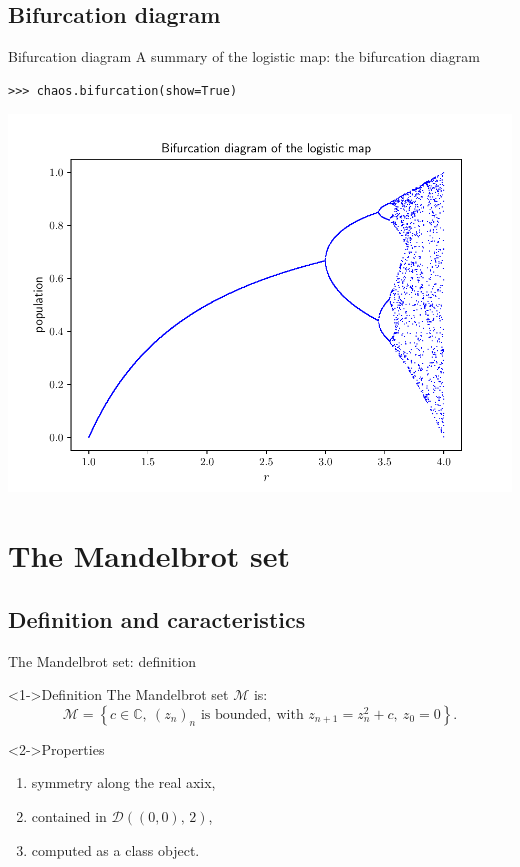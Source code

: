 \documentclass[11pt, compress, tikz]{beamer}
\theoremstyle{definition}
\begin{document}
\subsection{Bifurcation diagram}
\begin{frame}[fragile]{Bifurcation diagram}
A summary of the logistic map: the bifurcation diagram
\begin{verbatim}
>>> chaos.bifurcation(show=True)
\end{verbatim}
\begin{center}
    \includegraphics[scale=0.6, clip, trim={0 0 0 2cm}]{bifurcation.pdf}
\end{center}
\end{frame}



\section[Mandelbrot]{The Mandelbrot set}
\subsection{Definition and caracteristics}


\begin{frame}{The Mandelbrot set: definition}



\begin{block}<1->{Definition}
The Mandelbrot set $\mathcal{M}$ is:
$$\mathcal{M}=\left\{ c\in\mathbb{C},\ (z_n)_n \text{ is bounded},\ \text{with } z_{n+1}=z_n^2+c,\ z_0=0\right\}.$$
\end{block}
\begin{block}<2->{Properties}
\begin{enumerate}[label=$\bullet$]
\item symmetry along the real axix,
\item contained in $\mathcal{D}((0,0),\, 2)$,
\item computed as a class object.
\end{enumerate}
\end{block}
\end{frame}
\end{document}
